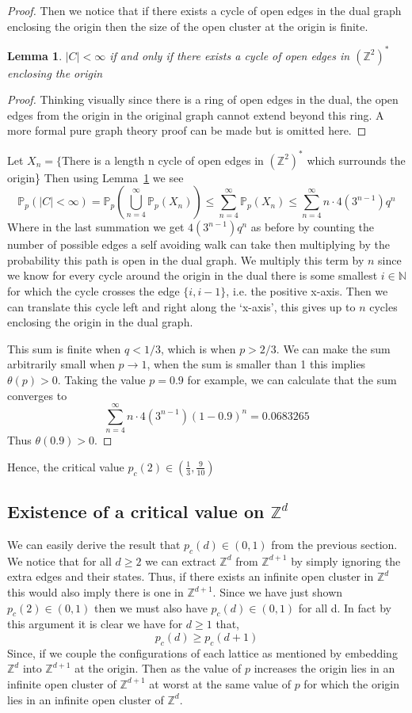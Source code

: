 \documentclass[a4paper,11pt]{article}
\newtheorem{lemma}[theorem]{Lemma}
\theoremstyle{definition}
\newcommand{\ints}{\mathbb{Z}}
\newcommand{\ztwodual}{(\ints^2)^*}
\newcommand{\prob}{\mathbb{P}_p}
\begin{document}
\begin{proof}
	Then we notice that if there exists a cycle of open edges in the dual graph enclosing the origin then the size of the open cluster at the origin is finite. 
	\begin{lemma}\label{originloop}
		$|C| < \infty$ if and only if there exists a cycle of open edges in $(\ints^2)^*$  enclosing the origin
	\end{lemma}
	\begin{proof}
		{Thinking visually since there is a ring of open edges in the dual, the open edges from the origin in the original graph cannot extend beyond this ring. A more formal pure graph theory proof can be made but is omitted here.}
	\end{proof}
	Let $X_n = \{$There is a length n cycle of open edges in $\ztwodual$ which surrounds the origin\}
	Then using Lemma~\ref{originloop} we see
	$$\prob(|C| < \infty) = \prob\left(\bigcup_{n=4}^\infty \prob(X_n)\right) \leq \sum_{n=4}^\infty \prob(X_n) \leq \sum_{n=4}^\infty n \cdot 4(3^{n-1})q^n$$
	Where in the last summation we get $4(3^{n-1})q^n$ as before by counting the number of possible edges a self avoiding walk can take then multiplying by the probability this path is open in the dual graph. 
	We multiply this term by $n$ since we know for every cycle around the origin in the dual there is some smallest $i \in \mathbb{N}$ for which the cycle crosses the edge $\{i,i-1\}$, i.e. the positive x-axis. 
	Then we can translate this cycle left and right along the `x-axis', this gives up to $n$ cycles enclosing the origin in the dual graph.


	This sum is finite when $q<1/3$, which is when $p>2/3$. 
	We can make the sum arbitrarily small when $p \rightarrow 1$, when the sum is smaller than 1 this implies $\theta(p) > 0$.
	Taking the value $p=0.9$ for example, we can calculate that the sum converges to 
	$$\sum_{n=4}^\infty n \cdot 4(3^{n-1})(1-0.9)^n = 0.0683265$$
	Thus $\theta(0.9) > 0$.

\end{proof}
Hence, the critical value $p_c(2) \in (\frac{1}{3},\frac{9}{10})$




\subsection {Existence of a critical value on \texorpdfstring{$\ints^d$}{ Zd}}
We can easily derive the result that $p_c(d)\in (0,1)$ from the previous section. 
We notice that for all $d\geq 2$ we can extract $\ints^d$ from $\ints^{d+1}$ by simply ignoring the extra edges and their states.
Thus, if there exists an infinite open cluster in $\ints^d$ this would also imply there is one in $\ints^{d+1}$.
Since we have just shown $p_c(2) \in (0,1)$ then we must also have $p_c(d) \in (0,1)$ for all d. In fact by this argument it is clear we have for $d \geq 1$ that,
$$p_c(d) \geq  p_c(d+1) $$
Since, if we couple the configurations of each lattice as mentioned by embedding $\ints^d$ into $\ints^{d+1}$ at the origin. Then as the value of $p$ increases the origin lies in an infinite open cluster of $\ints^{d+1}$ at worst at the same value of $p$ for which the origin lies in an infinite open cluster of $\ints^d$.
\end{document}

